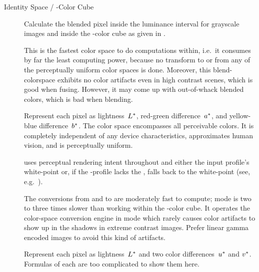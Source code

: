 \begin{description}
\item[Identity Space / \acronym{RGB}-Color Cube]\itemend
  Calculate the blended pixel inside the luminance interval 
  for grayscale images and inside the -color cube as given in
  .

  This is the fastest color space to do computations within, i.e.\ it consumes by far the least
  computing power, because no transform to or from any of the perceptually uniform color spaces
  is done.  Moreover, this blend-colorspace exhibits no color artifacts even in high contrast
  scenes, which is good when fusing.  However, it may come up with out-of-whack blended colors,
  which is bad when blending.

\item[\urlmark{\wikipedialabcolorspace}{\acronym{L*a*b*}}]\itemend\urltext
  Represent each pixel as lightness~$L\mbox{${}^{*}$}$, red-green difference~$a\mbox{${}^{*}$}$,
  and yellow-blue difference~$b\mbox{${}^{*}$}$.  The  color space encompasses
  all perceivable colors.  It is completely independent of any device characteristics,
  approximates human vision, and is perceptually uniform.

  \App{} uses perceptual rendering intent throughout and either the input profile's white-point
  or, if the -profile lacks the , falls back to the  white-point (see,
  e.g.\ ).

  The conversions from and to  are moderately fast to compute; 
  mode is two to three times slower than working within the -color cube.  It
  operates the  color-space conversion engine in
   mode which rarely causes color artifacts to show
  up in the shadows in extreme contrast images.  Prefer linear gamma encoded images to avoid
  this kind of artifacts.

\item[\urlmark{\wikipediacieluvcolorspace}{\acronym{CIEL*u*v*}}]\itemend\urltext
  Represent each pixel as lightness~$L\mbox{${}^{*}$}$ and two color
  differences~$u\mbox{${}^{*}$}$ and $v\mbox{${}^{*}$}$.  Formulas of each are too complicated
  to show them here.


\end{description}
